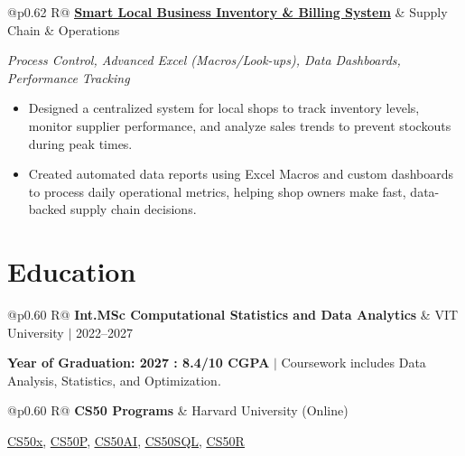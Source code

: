 \documentclass[a4paper,10pt]{article}
\newcommand{\ulink}[2]{\href{#1}{\uline{#2}}}
\newcommand{\subheading}[1]{{\color[HTML]{0A0A0A}\fontsize{12}{14}\selectfont\bfseries #1}}
\newcommand{\techstack}[1]{{\color[HTML]{5C5C5C}\fontsize{10.5}{12.5}\selectfont\itshape #1}}
\newcommand{\meta}[1]{{\color[HTML]{5C5C5C}\fontsize{10.5}{12.5}\selectfont #1}}
\begin{document}
\begin{tabularx}{\linewidth}{@{}p{0.62\linewidth} R@{}}
\subheading{\ulink{https://github.com/su-jin1425/Smart-Local-Business-Inventory-Billing-System}{Smart Local Business Inventory \& Billing System}} & \meta{Supply Chain \& Operations}
\end{tabularx}
\vspace{1pt}
\techstack{Process Control, Advanced Excel (Macros/Look-ups), Data Dashboards, Performance Tracking}
\begin{itemize}[nosep, leftmargin=1.5em, itemsep=1pt, topsep=2pt]
  \item {\color[HTML]{0A0A0A}\fontsize{11}{14}\selectfont Designed a centralized system for local shops to track inventory levels, monitor supplier performance, and analyze sales trends to prevent stockouts during peak times.}
  \item {\color[HTML]{0A0A0A}\fontsize{11}{14}\selectfont Created automated data reports using Excel Macros and custom dashboards to process daily operational metrics, helping shop owners make fast, data-backed supply chain decisions.}
\end{itemize}

\vspace{2pt}

\section{Education}
\vspace{2pt}

\begin{tabularx}{\linewidth}{@{}p{0.60\linewidth} R@{}}
\subheading{Int.MSc Computational Statistics and Data Analytics} & \meta{VIT University $|$ 2022--2027}
\end{tabularx}
\vspace{1pt}
{\color[HTML]{3A3A3A}\fontsize{11}{14}\selectfont \textbf{Year of Graduation: 2027 : 8.4/10 CGPA} $|$ Coursework includes Data Analysis, Statistics, and Optimization.}

\vspace{1pt}

\begin{tabularx}{\linewidth}{@{}p{0.60\linewidth} R@{}}
\subheading{CS50 Programs} & \meta{Harvard University (Online)}
\end{tabularx}
\vspace{1pt}
{\color[HTML]{3A3A3A}\fontsize{11}{14}\selectfont \ulink{https://cs50.harvard.edu/certificates/b14b78df-e05c-413e-a607-1dd27303053a}{CS50x}, \ulink{https://cs50.harvard.edu/certificates/32477052-9db4-49c4-a5a4-d7e58429ca2c}{CS50P}, \ulink{https://cs50.harvard.edu/certificates/9cdb4d4a-1250-4f8e-9fd7-191864e0f919}{CS50AI}, \ulink{https://cs50.harvard.edu/certificates/bc486f24-f085-4e61-8536-80940b97a1b9}{CS50SQL}, \ulink{https://cs50.harvard.edu/certificates/666838e6-a053-4d82-b179-a60fe745fd84}{CS50R}}
\end{document}
